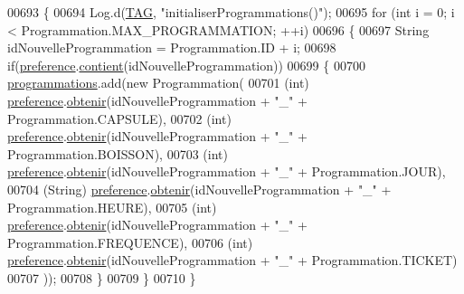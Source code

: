 \begin{DoxyCode}
00693     \{
00694         Log.d(\hyperlink{classcom_1_1example_1_1ekawa_1_1_cafetiere_aa0c1fd99a2508b06c462aea17034aa91}{TAG}, \textcolor{stringliteral}{"initialiserProgrammations()"});
00695         \textcolor{keywordflow}{for} (\textcolor{keywordtype}{int} i = 0; i < Programmation.MAX\_PROGRAMMATION; ++i)
00696         \{
00697             String idNouvelleProgrammation = Programmation.ID + i;
00698             \textcolor{keywordflow}{if}(\hyperlink{classcom_1_1example_1_1ekawa_1_1_cafetiere_aee3f9b78df63bc8dd73bf564954d51ca}{preference}.\hyperlink{classcom_1_1example_1_1ekawa_1_1_preference_a25b7a4cfcc9fe5f9258471ce454a718a}{contient}(idNouvelleProgrammation))
00699             \{
00700                 \hyperlink{classcom_1_1example_1_1ekawa_1_1_cafetiere_a987c8e1bcea506b65f4b05f955b3f699}{programmations}.add(\textcolor{keyword}{new} Programmation(
00701                         (\textcolor{keywordtype}{int}) \hyperlink{classcom_1_1example_1_1ekawa_1_1_cafetiere_aee3f9b78df63bc8dd73bf564954d51ca}{preference}.\hyperlink{classcom_1_1example_1_1ekawa_1_1_preference_a485d7fe31708aa1b85c0e2dcdcc05c0d}{obtenir}(idNouvelleProgrammation + \textcolor{stringliteral}{"\_"} + 
      Programmation.CAPSULE),
00702                         (int) \hyperlink{classcom_1_1example_1_1ekawa_1_1_cafetiere_aee3f9b78df63bc8dd73bf564954d51ca}{preference}.\hyperlink{classcom_1_1example_1_1ekawa_1_1_preference_a485d7fe31708aa1b85c0e2dcdcc05c0d}{obtenir}(idNouvelleProgrammation + \textcolor{stringliteral}{"\_"} + 
      Programmation.BOISSON),
00703                         (int) \hyperlink{classcom_1_1example_1_1ekawa_1_1_cafetiere_aee3f9b78df63bc8dd73bf564954d51ca}{preference}.\hyperlink{classcom_1_1example_1_1ekawa_1_1_preference_a485d7fe31708aa1b85c0e2dcdcc05c0d}{obtenir}(idNouvelleProgrammation + \textcolor{stringliteral}{"\_"} + 
      Programmation.JOUR),
00704                         (String) \hyperlink{classcom_1_1example_1_1ekawa_1_1_cafetiere_aee3f9b78df63bc8dd73bf564954d51ca}{preference}.\hyperlink{classcom_1_1example_1_1ekawa_1_1_preference_a485d7fe31708aa1b85c0e2dcdcc05c0d}{obtenir}(idNouvelleProgrammation + \textcolor{stringliteral}{"\_"} + 
      Programmation.HEURE),
00705                         (int) \hyperlink{classcom_1_1example_1_1ekawa_1_1_cafetiere_aee3f9b78df63bc8dd73bf564954d51ca}{preference}.\hyperlink{classcom_1_1example_1_1ekawa_1_1_preference_a485d7fe31708aa1b85c0e2dcdcc05c0d}{obtenir}(idNouvelleProgrammation + \textcolor{stringliteral}{"\_"} + 
      Programmation.FREQUENCE),
00706                         (int) \hyperlink{classcom_1_1example_1_1ekawa_1_1_cafetiere_aee3f9b78df63bc8dd73bf564954d51ca}{preference}.\hyperlink{classcom_1_1example_1_1ekawa_1_1_preference_a485d7fe31708aa1b85c0e2dcdcc05c0d}{obtenir}(idNouvelleProgrammation + \textcolor{stringliteral}{"\_"} + 
      Programmation.TICKET)
00707                 ));
00708             \}
00709         \}
00710     \}
\end{DoxyCode}
